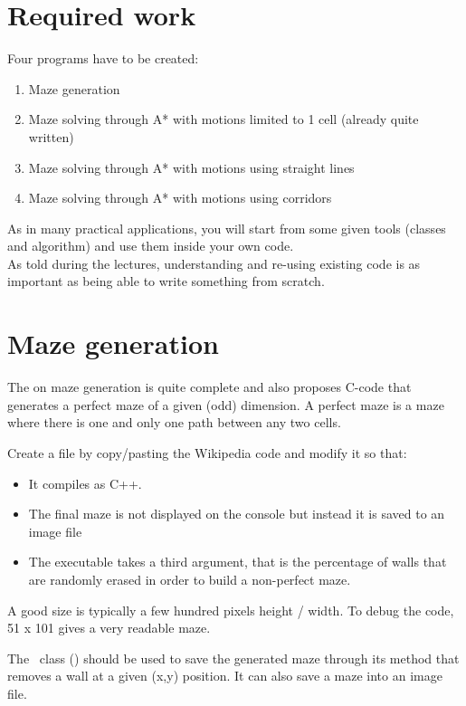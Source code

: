 \documentclass{ecnreport}
\def\maze{\okttt{ecn::Maze}~}
\begin{document}
\section{Required work}

Four programs have to be created: 
\begin{enumerate}
 \item Maze generation
 \item Maze solving through A* with motions limited to 1 cell (already quite written)
 \item Maze solving through A* with motions using straight lines
 \item Maze solving through A* with motions using corridors
\end{enumerate}

As in many practical applications, you will start from some given tools (classes and algorithm) and use them inside your own code.\\
As told during the lectures, understanding and re-using existing code is as important as being able to write something from scratch.

\section{Maze generation}

The  on maze generation is quite complete
and also proposes C-code that generates a perfect maze of a given (odd) dimension. A perfect maze is a maze where there is one and only 
one path between any two cells.

Create a  file by copy/pasting the Wikipedia code and modify it so that:
\begin{itemize}
 \item It compiles as C++.
 \item The final maze is not displayed on the console but instead it is saved to an image file 
 \item The executable takes a third argument, that is the percentage of walls that are randomly erased in order to build a non-perfect maze.
\end{itemize}
A good size is typically a few hundred pixels height / width. To debug the code, 51 x 101 gives a very readable maze.

The \maze class () should be used to save the generated maze through its  method that removes a wall at a given (x,y) position.
It can also save a maze into an image file.
\end{document}
